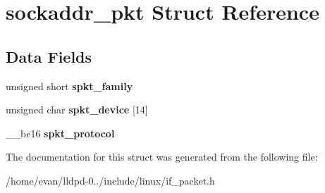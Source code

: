 \section{sockaddr\-\_\-pkt \-Struct \-Reference}
\label{structsockaddr__pkt}
\subsection*{\-Data \-Fields}
\begin{DoxyCompactItemize}
\item 
unsigned short {\bfseries spkt\-\_\-family}\label{structsockaddr__pkt_a8a847a00dc8964310107ecf123378942}

\item 
unsigned char {\bfseries spkt\-\_\-device} [14]\label{structsockaddr__pkt_aacf88390be93c7315fb96d33beccf2d6}

\item 
\-\_\-\-\_\-be16 {\bfseries spkt\-\_\-protocol}\label{structsockaddr__pkt_abcb9307b8617e88fe381912ab6911d38}

\end{DoxyCompactItemize}


\-The documentation for this struct was generated from the following file\-:\begin{DoxyCompactItemize}
\item 
/home/evan/lldpd-\/0../include/linux/if\-\_\-packet.\-h\end{DoxyCompactItemize}
